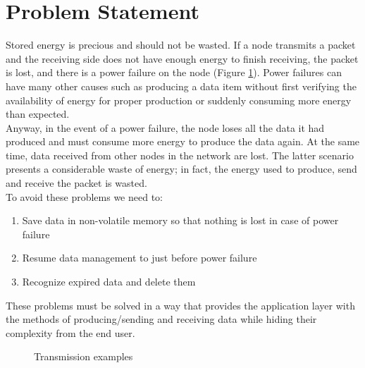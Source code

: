 \section{Problem Statement}
\label{sec:problemStatement}
Stored energy is precious and should not be wasted. If a node transmits a packet and the receiving side does not have enough energy to finish receiving, the packet is lost, and there is a power failure on the node (Figure \ref{fig:TransmissionProblem}).
Power failures can have many other causes such as producing a data item without first verifying the availability of energy for proper production or suddenly consuming more energy than expected.
\\Anyway, in the event of a power failure, the node loses all the data it had produced and must consume more energy to produce the data again. At the same time, data received from other nodes in the network are lost. The latter scenario presents a considerable waste of energy; in fact, the energy used to produce, send and receive the packet is wasted.\\
To avoid these problems we need to:
\begin{enumerate}
\item Save data in non-volatile memory so that nothing is lost in case of power failure
\item Resume data management to just before power failure
\item Recognize expired data and delete them
\end{enumerate}
These problems must be solved in a way that provides the application layer with the methods of producing/sending and receiving data while hiding their complexity from the end user.
\begin{figure}[ht]
\centerline{}
\caption{\footnotesize \centering Transmission examples}
\label{fig:TransmissionProblem}
\end{figure}
